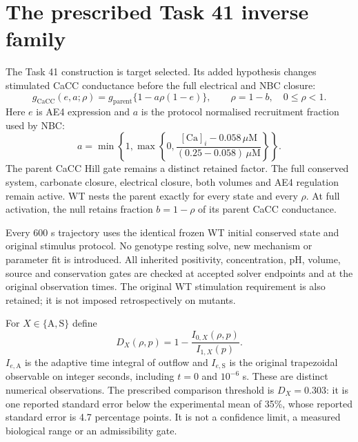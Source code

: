 \section{The prescribed Task 41 inverse family}
\label{sec:task41inverse}

The Task 41 construction is target selected. Its added hypothesis changes
stimulated CaCC conductance before the full electrical and NBC closure:
\begin{equation}
 g_{\mathrm{CaCC}}(e,a;\rho)
 =g_{\mathrm{parent}}\{1-a\rho(1-e)\},\qquad
 \rho=1-b,\quad 0\leq\rho<1.
 \label{eq:inversefamily}
\end{equation}
Here $e$ is AE4 expression and $a$ is the protocol normalised recruitment
fraction used by NBC:
\[
 a=\min\!\left\{1,\max\!\left\{0,
 \frac{[\mathrm{Ca}]_i-0.058\,\mu\mathrm M}{(0.25-0.058)\,\mu\mathrm M}
 \right\}\right\}.
\]
The parent CaCC Hill gate remains a distinct retained factor.
The full conserved system, carbonate closure, electrical closure, both
volumes and AE4 regulation remain active. WT nests the parent exactly for
every state and every $\rho$. At full activation, the null retains fraction
$b=1-\rho$ of its parent CaCC conductance.

Every 600 s trajectory uses the identical frozen WT initial conserved state
and original stimulus protocol. No genotype resting solve, new mechanism or
parameter fit is introduced. All inherited positivity, concentration, pH,
volume, source and conservation gates are checked at accepted solver endpoints
and at the original observation times. The original WT stimulation requirement
is also retained; it is not imposed retrospectively on mutants.

For $X\in\{\mathrm{A},\mathrm{S}\}$ define
\begin{equation}
 D_X(\rho,p)=1-\frac{I_{0,X}(\rho,p)}{I_{1,X}(p)}.
 \label{eq:inverseobservable}
\end{equation}
$I_{e,\mathrm A}$ is the adaptive time integral of outflow and
$I_{e,\mathrm S}$ is the original trapezoidal observable on integer seconds,
including $t=0$ and $10^{-6}$ s. These are distinct numerical observations.
The prescribed comparison threshold is $D_X=0.303$: it is one reported
standard error below the experimental mean of 35\%, whose reported standard
error is 4.7 percentage points. It is not a confidence limit, a measured
biological range or an admissibility gate.


